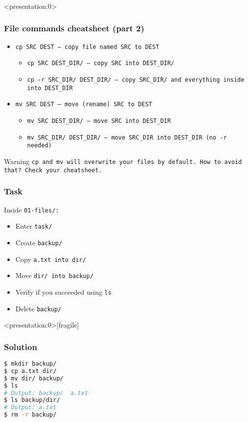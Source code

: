 \begin{frame}<presentation:0>
\frametitle{File commands cheatsheet (part 2)}
\begin{itemize}
    \item \tt{cp SRC DEST} — copy file named SRC to DEST
    \begin{itemize}
        \item \tt{cp SRC DEST\_DIR/} — copy SRC into DEST\_DIR/
        \item \tt{cp -r SRC\_DIR/ DEST\_DIR/}
            — copy SRC\_DIR/ and everything inside into DEST\_DIR
    \end{itemize}
    \item \tt{mv SRC DEST} — move (rename) SRC to DEST
    \begin{itemize}
        \item \tt{mv SRC DEST\_DIR/} — move SRC into DEST\_DIR
        \item \tt{mv SRC\_DIR/ DEST\_DIR/}
            — move SRC\_DIR into DEST\_DIR (no \tt{-r} needed)
    \end{itemize}
\end{itemize}
\begin{alertblock}{Warning}
    \tt{cp} and \tt{mv} will overwrite your files by default.
    How to avoid that? Check your cheatsheet.
\end{alertblock}
\end{frame}

\begin{frame}
\frametitle{Task}
Inside \tt{01-files/}:
\begin{itemize}
    \item Enter \tt{task/}
    \item Create \tt{backup/}
    \item Copy \tt{a.txt} into \tt{dir/}
    \item Move \tt{dir/} into \tt{backup/}
    \item Verify if you succeeded using \tt{ls}
    \item Delete \tt{backup/}
\end{itemize}
\end{frame}

\begin{frame}<presentation:0>[fragile]
\frametitle{Solution}
\begin{lstlisting}[language=bash]
$ mkdir backup/
$ cp a.txt dir/
$ mv dir/ backup/
$ ls
# Output: backup/  a.txt
$ ls backup/dir/
# Output: a.txt
$ rm -r backup/
\end{lstlisting}
\end{frame}
